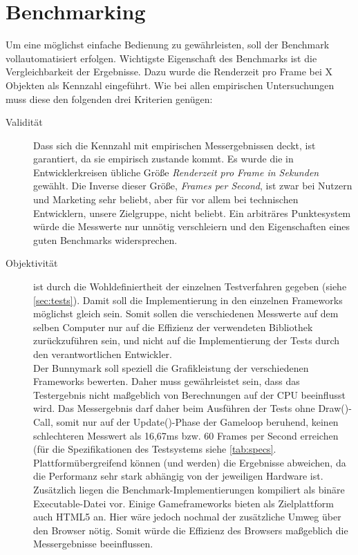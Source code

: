 \section{Benchmarking}
Um eine möglichst einfache Bedienung zu gewährleisten, soll der Benchmark vollautomatisiert erfolgen. Wichtigste Eigenschaft des Benchmarks ist die Vergleichbarkeit der Ergebnisse. Dazu wurde die Renderzeit pro Frame bei X Objekten als Kennzahl eingeführt. Wie bei allen empirischen Untersuchungen muss diese den folgenden drei Kriterien genügen:\\ %
\begin{description}
\item[Validität] Dass sich die Kennzahl mit empirischen Messergebnissen deckt, ist garantiert, da sie empirisch zustande kommt. Es wurde die in Entwicklerkreisen übliche Größe {\em Renderzeit pro Frame in Sekunden} gewählt. Die Inverse dieser Größe, {\em Frames per Second}, ist zwar bei Nutzern und Marketing sehr beliebt, aber für vor allem bei technischen Entwicklern, unsere Zielgruppe, nicht beliebt. Ein arbiträres Punktesystem würde die Messwerte nur unnötig verschleiern und den Eigenschaften eines guten Benchmarks widersprechen.\\
\item[Objektivität] ist durch die Wohldefiniertheit der einzelnen Testverfahren gegeben (siehe \ref{sec:tests}). Damit soll die Implementierung in den einzelnen Frameworks möglichst gleich sein. Somit sollen die verschiedenen Messwerte auf dem selben Computer nur auf die Effizienz der verwendeten Bibliothek zurückzuführen sein, und nicht auf die Implementierung der Tests durch den verantwortlichen Entwickler.\\
Der Bunnymark soll speziell die Grafikleistung der verschiedenen Frameworks bewerten. Daher muss gewährleistet sein, dass das Testergebnis nicht maßgeblich von Berechnungen auf der CPU beeinflusst wird. Das Messergebnis darf daher beim Ausführen der Tests ohne Draw()-Call, somit nur auf der Update()-Phase der Gameloop beruhend, keinen schlechteren Messwert als 16,67ms bzw. 60 Frames per Second erreichen (für die Spezifikationen des Testsystems siehe \ref{tab:specs}. Plattformübergreifend können (und werden) die Ergebnisse abweichen, da die Performanz sehr stark abhängig von der jeweiligen Hardware ist.\\
Zusätzlich liegen die Benchmark-Implementierungen kompiliert als binäre Executable-Datei vor. Einige Gameframeworks bieten als Zielplattform auch HTML5 an. Hier wäre jedoch nochmal der zusätzliche Umweg über den Browser nötig. Somit würde die Effizienz des Browsers maßgeblich die Messergebnisse beeinflussen.\\


\end{description}
